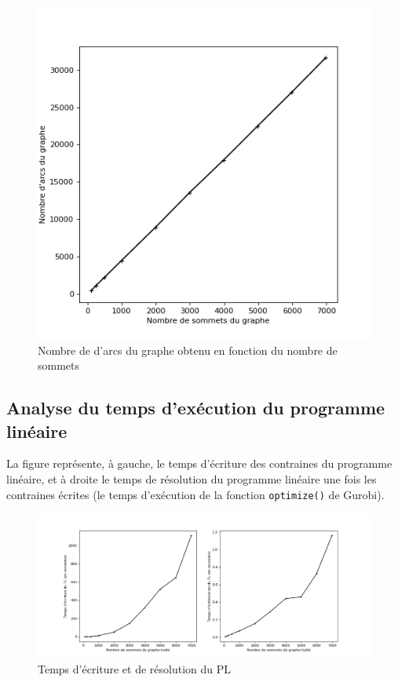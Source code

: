 \documentclass{article}
\begin{document}
\begin{figure}[h!]
    \centering
    \includegraphics[scale=0.45]{n_edges_n_vert_g.png}
    \caption{Nombre de d'arcs du graphe obtenu en fonction du nombre de sommets}
    \label{fig:vertices-edges}
\end{figure}

\subsection{Analyse du temps d'exécution du programme linéaire}
La figure représente, à gauche, le temps d'écriture des contraines du programme
linéaire, et à droite le temps de résolution du programme linéaire une fois les
contraines écrites (le temps d'exécution de la fonction \texttt{optimize()} de
Gurobi).

\begin{figure}[h!]
    \includegraphics[scale=0.47]{lp_writing_lp_opt.png}{}
    \caption{Temps d'écriture et de résolution du PL}
    \label{wo-time}
\end{figure}
\end{document}
